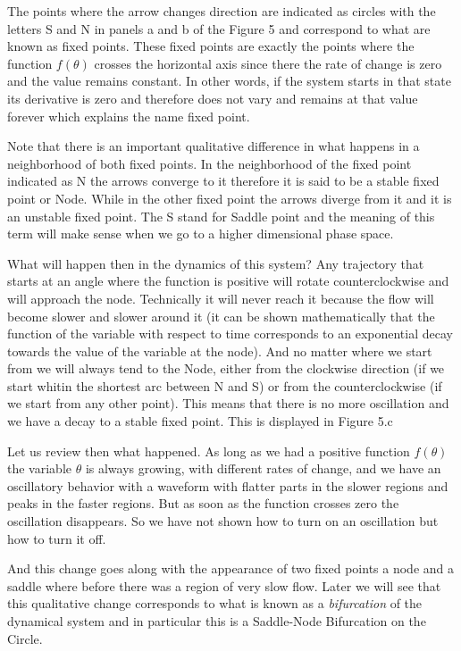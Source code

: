 \documentclass{article}
\begin{document}
The points where the arrow changes direction are indicated as circles with the letters S and N in panels a and b of the Figure 5 and correspond to what are known as fixed points. These fixed points are exactly the points where the function $f(\theta)$ crosses the horizontal axis since there the rate of change is zero and the value remains constant. 
In other words, if the system starts in that state its derivative is zero and therefore does not vary and remains at that value forever which explains the name fixed point. 

Note that there is an important qualitative difference in what happens in a neighborhood of both fixed points. 
In the neighborhood of the fixed point indicated as N the arrows converge to it therefore it is said to be a stable fixed point or Node.  
While in the other fixed point the arrows diverge from it and it is an unstable fixed point. The S stand for Saddle point and the meaning of this term will make sense when we go to a higher dimensional phase space.

What will happen then in the dynamics of this system? 
Any trajectory that starts at an angle where the function is positive will rotate counterclockwise and will approach the node. 
Technically it will never reach it because the flow will become slower and slower around it (it can be shown mathematically that the function of the variable with respect to time corresponds to an exponential decay towards the value of the variable at the node). 
And no matter where we start from we will always tend to the Node, either from the clockwise direction (if we start whitin the shortest arc between N and S) or from the counterclockwise (if we start from any other point). 
This means that there is no more oscillation and we have a decay to a stable fixed point.
This is displayed in Figure 5.c

Let us review then what happened. 
As long as we had a positive function $f(\theta)$ the variable $\theta$ is always growing, with different rates of change, and we have an oscillatory behavior with a waveform with flatter parts in the slower regions and peaks in the faster regions. 
But as soon as the function crosses zero the oscillation disappears. 
So we have not shown how to turn on an oscillation but how to turn it off. 

And this change goes along with the appearance of two fixed points a node and a saddle where before there was a region of very slow flow. 
Later we will see that this qualitative change corresponds to what is known as a {\em bifurcation} of the dynamical system and in particular this is a Saddle-Node Bifurcation on the Circle. 
\end{document}
